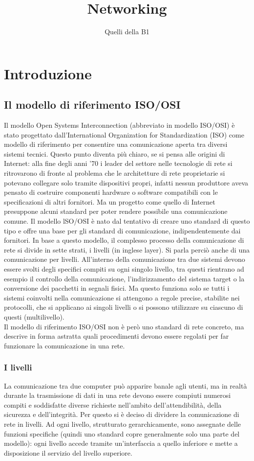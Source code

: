 \documentclass[a4paper,11pt]{article}
\author{Quelli della B1}
\title{Networking}
\def\sec#1{\section{#1}\label{#1}}
\def\sub#1{\subsection{#1}\label{#1}}
\def\subsub#1{\subsubsection{#1}\label{#1}}
\begin{document}
\maketitle
\newpage
\tableofcontents
\newpage

\sec{Introduzione}
\sub{Il modello di riferimento ISO/OSI}
Il modello Open Systems Interconnection (abbreviato in modello ISO/OSI) è stato progettato dall’International Organization for Standardization (ISO) come modello di riferimento per consentire una comunicazione aperta tra diversi sistemi tecnici. Questo punto diventa più chiaro, se si pensa alle origini di Internet: alla fine degli anni ’70 i leader del settore nelle tecnologie di rete si ritrovarono di fronte al problema che le architetture di rete proprietarie si potevano collegare solo tramite dispositivi propri, infatti nessun produttore aveva pensato di costruire componenti hardware o software compatibili con le specificazioni di altri fornitori. Ma un progetto come quello di Internet presuppone alcuni standard per poter rendere possibile una comunicazione comune.
Il modello lSO/OSI è nato dal tentativo di creare uno standard di questo tipo e offre una base per gli standard di comunicazione, indipendentemente dai fornitori. In base a questo modello, il complesso processo della comunicazione di rete si divide in sette strati, i livelli (in inglese layer). Si parla perciò anche di una comunicazione per livelli. All’interno della comunicazione tra due sistemi devono essere svolti degli specifici compiti su ogni singolo livello, tra questi rientrano ad esempio il controllo della comunicazione, l’indirizzamento del sistema target o la conversione dei pacchetti in segnali fisici. Ma questo funziona solo se tutti i sistemi coinvolti nella comunicazione si attengono a regole precise, stabilite nei protocolli, che si applicano ai singoli livelli o si possono utilizzare su ciascuno di questi (multilivello).
\\Il modello di riferimento ISO/OSI non è però uno standard di rete concreto, ma descrive in forma astratta quali procedimenti devono essere regolati per far funzionare la comunicazione in una rete.  
\subsub{I livelli}
La comunicazione tra due computer può apparire banale agli utenti, ma in realtà durante la trasmissione di dati in una rete devono essere compiuti numerosi compiti e soddisfatte diverse richieste nell’ambito dell’attendibilità, della sicurezza e dell’integrità. Per questo si è deciso di dividere la comunicazione di rete in livelli. Ad ogni livello, strutturato gerarchicamente, sono assegnate delle funzioni specifiche (quindi uno standard copre generalmente solo una parte del modello): ogni livello accede tramite un’interfaccia a quello inferiore e mette a disposizione il servizio del livello superiore.
\end{document}
